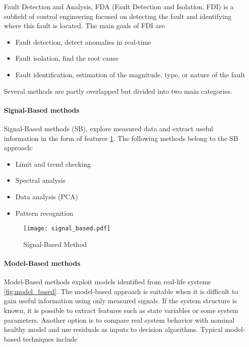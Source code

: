 Fault Detection and Analysis, FDA (Fault Detection and Isolation, FDI) is a
subfield of control engineering focused on detecting the fault and
identifying where this fault is located. 
The main goals of FDI are
\begin{itemize}
    \item Fault detection, detect anomalies in real-time
    \item Fault isolation, find the root cause
    \item Fault identification, estimation of the magnitude, type, or nature of
        the fault 
\end{itemize}

Several methods are partly overlapped but divided into two main
categories. 

\paragraph{Signal-Based methods} Signal-Based methods (SB), explore measured
data and extract useful information in the form of features
\ref{fig:signal_based}. The following methods belong to the SB approach: 

\begin{itemize}
    \item Limit and trend checking
    \item Spectral analysis
    \item Data analysis (PCA)
    \item Pattern recognition
\end{itemize}

\begin{figure}[h!]
    \centering
    \texttt{[image: signal\_based.pdf]}
    \caption{Signal-Based Method}
    \label{fig:signal_based}
\end{figure}


\paragraph{Model-Based methods} Model-Based methods exploit models identified
from real-life systems \ref{fig:model_based}. The model-based approach is
suitable when it is difficult to gain useful information using only
measured signals. If the system structure is known, it is possible to
extract features such as state variables or some system parameters.
Another option is to compare real system behavior with nominal healthy
model and use residuals as inputs to decision algorithms.
Typical model-based techniques include

